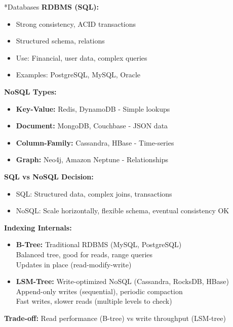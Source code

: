 \documentclass[8pt,landscape]{extarticle}
\makeatletter
\renewcommand{\subsection}{\@startsection{subsection}{2}{0pt}{3pt}{1pt}{\normalfont\normalsize\bfseries}}
\makeatother
\begin{document}
\begin{multicols*}{3}
\subsection*{Databases}
\textbf{RDBMS (SQL):}
\begin{itemize}
\item Strong consistency, ACID transactions
\item Structured schema, relations
\item Use: Financial, user data, complex queries
\item Examples: PostgreSQL, MySQL, Oracle
\end{itemize}
\textbf{NoSQL Types:}
\begin{itemize}
\item \textbf{Key-Value:} Redis, DynamoDB - Simple lookups
\item \textbf{Document:} MongoDB, Couchbase - JSON data
\item \textbf{Column-Family:} Cassandra, HBase - Time-series
\item \textbf{Graph:} Neo4j, Amazon Neptune - Relationships
\end{itemize}
\textbf{SQL vs NoSQL Decision:}
\begin{itemize}
\item SQL: Structured data, complex joins, transactions
\item NoSQL: Scale horizontally, flexible schema, eventual consistency OK
\end{itemize}
\textbf{Indexing Internals:}
\begin{itemize}
\item \textbf{B-Tree:} Traditional RDBMS (MySQL, PostgreSQL)
  \\ Balanced tree, good for reads, range queries
  \\ Updates in place (read-modify-write)
\item \textbf{LSM-Tree:} Write-optimized NoSQL (Cassandra, RocksDB, HBase)
  \\ Append-only writes (sequential), periodic compaction
  \\ Fast writes, slower reads (multiple levels to check)
\end{itemize}
\textbf{Trade-off:} Read performance (B-tree) vs write throughput (LSM-tree)


\end{multicols*}
\end{document}
